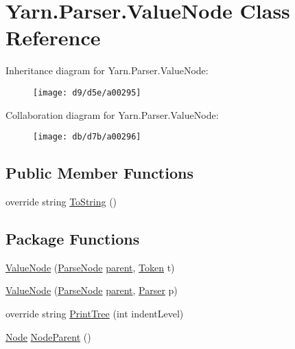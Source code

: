\hypertarget{a00087}{\section{Yarn.\-Parser.\-Value\-Node Class Reference}
\label{a00087}
}


Inheritance diagram for Yarn.\-Parser.\-Value\-Node\-:
\nopagebreak
\begin{figure}[H]
\begin{center}
\leavevmode
\texttt{[image: d9/d5e/a00295]}
\end{center}
\end{figure}


Collaboration diagram for Yarn.\-Parser.\-Value\-Node\-:
\nopagebreak
\begin{figure}[H]
\begin{center}
\leavevmode
\texttt{[image: db/d7b/a00296]}
\end{center}
\end{figure}
\subsection*{Public Member Functions}
\begin{DoxyCompactItemize}
\item 
override string \hyperlink{a00063_a18c67cb16090d0889bb9d6c8c6c565f8}{To\-String} ()
\end{DoxyCompactItemize}
\subsection*{Package Functions}
\begin{DoxyCompactItemize}
\item 
\hyperlink{a00087_a4d2911dde809291a8615262b9b0b4b46}{Value\-Node} (\hyperlink{a00063}{Parse\-Node} \hyperlink{a00063_af313a82103fcc2ff5a177dbb06b92f7b}{parent}, \hyperlink{a00079}{Token} t)
\item 
\hyperlink{a00087_ac63fbe99131dc3b42af16a2d087c0655}{Value\-Node} (\hyperlink{a00063}{Parse\-Node} \hyperlink{a00063_af313a82103fcc2ff5a177dbb06b92f7b}{parent}, \hyperlink{a00064}{Parser} p)
\item 
override string \hyperlink{a00087_ae4659e4431e9846a45e0d048c960781a}{Print\-Tree} (int indent\-Level)
\item 
\hyperlink{a00054}{Node} \hyperlink{a00063_a580e520a29444fc23ac3660cbe514a09}{Node\-Parent} ()
\end{DoxyCompactItemize}

